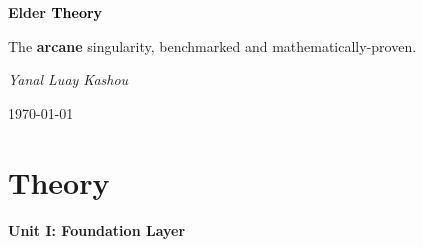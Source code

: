 \documentclass[11pt,twoside]{book}
\begin{document}
\frontmatter

\begin{titlepage}
    \centering
    \vspace*{2cm}
    {\Huge\bfseries \textcolor{DarkSkyBlue}{Elder }\textrm{\textcolor{black}{Theory}}\par}
    \vspace{2cm}
    {\Large The \textcolor{DarkSkyBlue}{\textbf{arcane}} singularity, benchmarked and mathematically-proven.\par}
    \vspace{4cm}
    {\Large\itshape Yanal Luay Kashou\par}
    \vfill
    {\large \today\par}
\end{titlepage}

\tableofcontents

\mainmatter







\part{Theory}

\begin{center}
\Large\bfseries Unit I: Foundation Layer
\end{center}
\vspace{1em}
\end{document}
